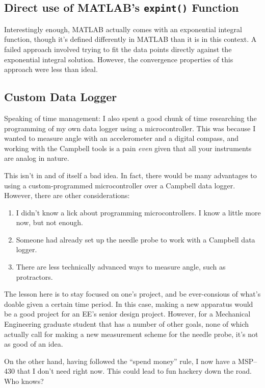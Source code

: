\subsection{Direct use of MATLAB's \texttt{expint()} Function}

Interestingly enough, MATLAB actually comes with an exponential integral
function, though it's defined differently in MATLAB than it is in this
context. A failed approach involved trying to fit the data points
directly against the exponential integral solution. However, the
convergence properties of this approach were less than ideal.

\subsection{Custom Data Logger}

Speaking of time management: I also spent a good chunk of time
researching the programming of my own data logger using a
microcontroller. This was because I wanted to measure angle with an
accelerometer and a digital compass, and working with the Campbell tools
is a pain \emph{even} given that all your instruments are analog in
nature.

This isn't in and of itself a bad idea. In fact, there would be many
advantages to using a custom-programmed microcontroller over a Campbell
data logger. However, there are other considerations:

\begin{enumerate}[1.]
\item
  I didn't know a lick about programming microcontrollers. I know a
  little more now, but not enough.
\item
  Someone had already set up the needle probe to work with a Campbell
  data logger.
\item
  There are less technically advanced ways to measure angle, such as
  protractors.
\end{enumerate}
The lesson here is to stay focused on one's project, and be
ever-consious of what's doable given a certain time period. In this
case, making a new apparatus would be a good project for an EE's senior
design project. However, for a Mechanical Engineering graduate student
that has a number of other goals, none of which actually call for making
a new measurement scheme for the needle probe, it's not as good of an
idea.

On the other hand, having followed the ``spend money'' rule, I now have
a MSP--430 that I don't need right now. This could lead to fun hackery
down the road. Who knows?

